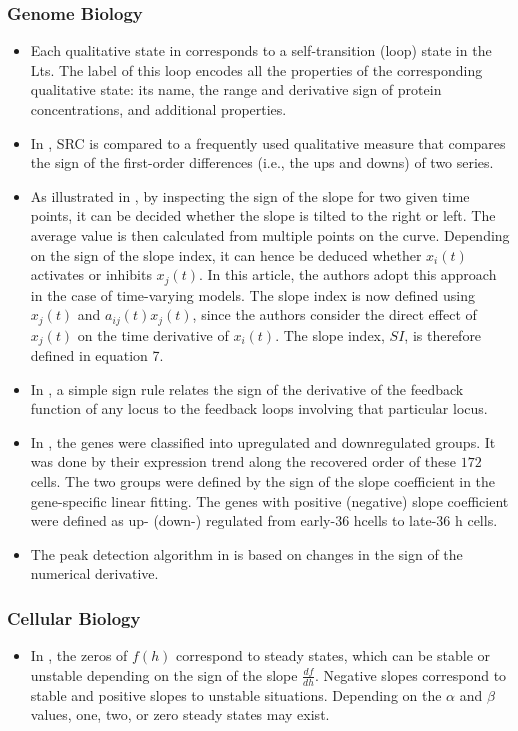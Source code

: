 \documentclass[11pt]{book}
\begin{document}
\subsubsection{Genome Biology}
\begin{itemize}
\item Each qualitative state in \cite{batt2004model}
corresponds to a self-transition (loop) state in the Lts. The label
of this loop encodes all the properties of the corresponding qualitative
state: its name, the range and derivative sign of protein concentrations,
and additional properties.
\item In \cite{balasubramaniyan2005clustering},
SRC is compared to a frequently used qualitative measure that compares
the sign of the first-order differences (i.e., the ups and downs)
of two series.
\item As illustrated in \cite{kim2008linear},
by inspecting the sign of the slope for two given time points, it
can be decided whether the slope is tilted to the right or left. The
average value is then calculated from multiple points on the curve.
Depending on the sign of the slope index, it can hence be deduced
whether $x_{i}\left(t\right)$ activates or inhibits $x_{j}\left(t\right)$.
In this article, the authors adopt this approach in the case of time-varying
models. The slope index is now defined using $x_{j}\left(t\right)$
and $a_{ij}\left(t\right)x_{j}\left(t\right)$, since the authors
consider the direct effect of $x_{j}\left(t\right)$ on the time derivative
of $x_{i}\left(t\right)$. The slope index, $SI$, is therefore defined
in equation 7.
\item In \cite{plahte2013propagation},
a simple sign rule relates the sign of the derivative of the feedback
function of any locus to the feedback loops involving that particular
locus.
\item In \cite{chu2016single},
the genes were classified into upregulated and downregulated groups.
It was done by their expression trend along the recovered order of
these $172$ cells. The two groups were defined by the sign of the
slope coefficient in the gene-specific linear fitting. The genes with
positive (negative) slope coefficient were defined as up- (down-)
regulated from early-$36$ hcells to late-$36$ h cells.
\item The peak detection algorithm in \cite{sedlyarova2017natural}
is based on changes in the sign of the numerical derivative.
\end{itemize}
\subsubsection{Cellular Biology}
\begin{itemize}
\item In \cite{sarkar2019field},
the zeros of $f\left(h\right)$ correspond to steady states, which
can be stable or unstable depending on the sign of the slope $\frac{df}{dh}$.
Negative slopes correspond to stable and positive slopes to unstable
situations. Depending on the $\alpha$ and $\beta$ values, one, two,
or zero steady states may exist.
\end{itemize}
\end{document}
